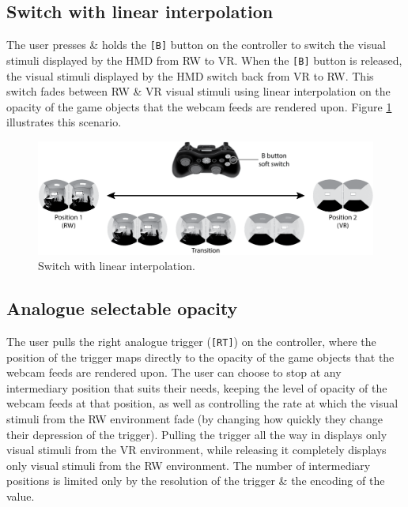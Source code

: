 \documentclass[oneside]{book}
\begin{document}
\subsection{Switch with linear interpolation}
The user presses \& holds the \texttt{[B]} button on the controller to switch the visual stimuli displayed by the HMD from RW to VR. When the \texttt{[B]} button is released, the visual stimuli displayed by the HMD switch back from VR to RW. This switch fades between RW \& VR  visual stimuli using linear interpolation on the opacity of the game objects that the webcam feeds are rendered upon. Figure \ref{scenario12} illustrates this scenario.

\begin{figure}[h]
	\begin{center}
		\includegraphics[width=\textwidth]{images/switching-soft-with-controller.png}
		\caption{Switch with linear interpolation.}
		\label{scenario12}
	\end{center}
\end{figure}

\subsection{Analogue selectable opacity}
The user pulls the right analogue trigger (\texttt{[RT]}) on the controller, where the position of the trigger maps directly to the opacity of the game objects that the webcam feeds are rendered upon. The user can choose to stop at any intermediary position that suits their needs, keeping the level of opacity of the webcam feeds at that position, as well as controlling the rate at which the visual stimuli from the RW environment fade (by changing how quickly they change their depression of the trigger). Pulling the trigger all the way in displays only visual stimuli from the VR environment, while releasing it completely displays only visual stimuli from the RW environment. The number of intermediary positions is limited only by the resolution of the trigger \& the encoding of the value.
\end{document}
